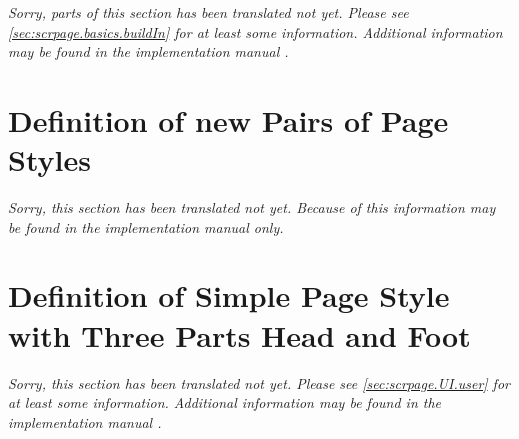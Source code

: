 \begin{Declaration}
  \\
  \\
  \\
\end{Declaration}
%
%
%
%
%
%
%
%
%

\begin{Declaration}
  \\
  \\
\end{Declaration}
%
%
%
%
%
%
%

\emph{Sorry, parts of this section has been translated not yet. Please see
  \autoref{sec:scrpage.basics.buildIn} for at least some
  information. Additional information may be found in the implementation
  manual .}


\section{Definition of new Pairs of Page Styles}
\label{sec:scrlayer-scrpage.pagestyle.pairs}

\emph{Sorry, this section has been translated not yet. Because of this
  information may be found in the implementation manual
   only.}

\section{Definition of Simple Page Style with Three Parts Head and Foot }
\label{sec:scrlayer-scrpage.pagestyle.triple}

\emph{Sorry, this section has been translated not yet. Please see
  \autoref{sec:scrpage.UI.user} for at least some
  information. Additional information may be found in the implementation
  manual .}

